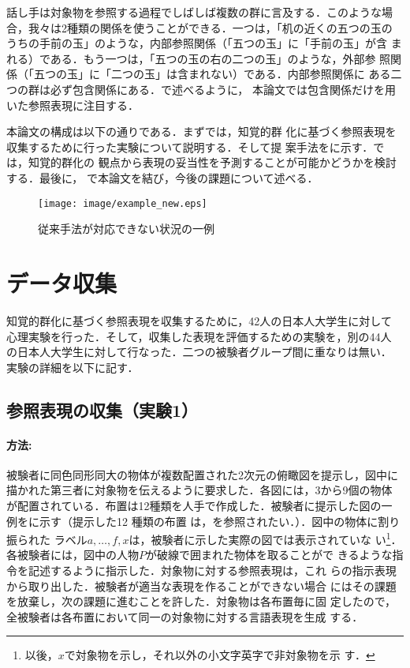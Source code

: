 \documentclass{nlp}
\begin{document}
話し手は対象物を参照する過程でしばしば複数の群に言及する．このような場
合，我々は2種類の関係を使うことができる．一つは，「机の近くの五つの玉の
うちの手前の玉」のような，内部参照関係（「五つの玉」に「手前の玉」が含
まれる）である．もう一つは，「五つの玉の右の二つの玉」のような，外部参
照関係（「五つの玉」に「二つの玉」は含まれない）である．内部参照関係に
ある二つの群は必ず包含関係にある．で述べるように，
本論文では包含関係だけを用いた参照表現に注目する．

本論文の構成は以下の通りである．まずでは，知覚的群
化に基づく参照表現を収集するために行った実験について説明する．そして提
案手法をに示す．では，知覚的群化の
観点から表現の妥当性を予測することが可能かどうかを検討する．最後に，
で本論文を結び，今後の課題について述べる．


\begin{figure}[bt]
  \centering
    \texttt{[image: image/example\_new.eps]}
    \caption{従来手法が対応できない状況の一例}
    \label{ex}
\end{figure}


\section{データ収集}
\label{sec:experiment}

知覚的群化に基づく参照表現を収集するために，42人の日本人大学生に対して
心理実験を行った．そして，収集した表現を評価するための実験を，別の44人
の日本人大学生に対して行なった．二つの被験者グループ間に重なりは無い．
実験の詳細を以下に記す．

\subsection{参照表現の収集（実験1）}
\label{subsec:experiment1}

\paragraph{方法:}

被験者に同色同形同大の物体が複数配置された2次元の俯瞰図を提示し，図中に
描かれた第三者に対象物を伝えるように要求した．各図には，3から9個の物体
が配置されている．布置は12種類を人手で作成した．被験者に提示した図の一
例をに示す（提示した12 種類の布置
は，を参照されたい．）．図中の物体に割り振られた
ラベル$a,\dots,f,x$は，被験者に示した実際の図では表示されていな
い\footnote{以後，$x$で対象物を示し，それ以外の小文字英字で非対象物を示
  す．}．各被験者には，図中の人物$P$が破線で囲まれた物体を取ることがで
きるような指令を記述するように指示した．対象物に対する参照表現は，これ
らの指示表現から取り出した．被験者が適当な表現を作ることができない場合
にはその課題を放棄し，次の課題に進むことを許した．対象物は各布置毎に固
定したので，全被験者は各布置において同一の対象物に対する言語表現を生成
する．
\end{document}
